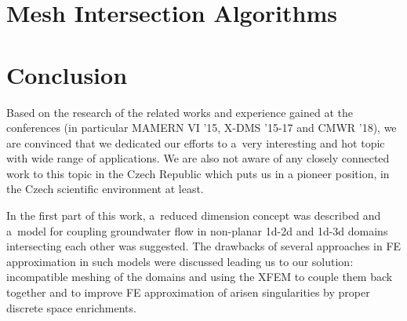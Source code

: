 \documentclass[bibliography=totocnumbered,dvipsnames,FM,Dis, EN]{tulthesis_autoreferat}
\begin{document}





\chapter{Mesh Intersection Algorithms} \label{chap:intersections}





\chapter{Conclusion} \label{chap:summary}


Based on the research of the related works and experience gained at the conferences
(in particular MAMERN VI '15, X-DMS '15-17 and CMWR '18),
we are convinced that we dedicated our efforts to a~very interesting and hot topic with wide range of applications.
We are also not aware of any closely connected work to this topic in the Czech Republic
which puts us in a pioneer position, in the Czech scientific environment at least.

In the first part of this work, a~reduced dimension concept was described and a~model for coupling
groundwater flow in non-planar 1d-2d and 1d-3d domains intersecting each other was suggested. 
The drawbacks of several approaches in FE approximation in such models were discussed leading us to
our solution: incompatible meshing of the domains and using the XFEM to couple them back together and to improve
FE approximation of arisen singularities by proper discrete space enrichments.
\end{document}
